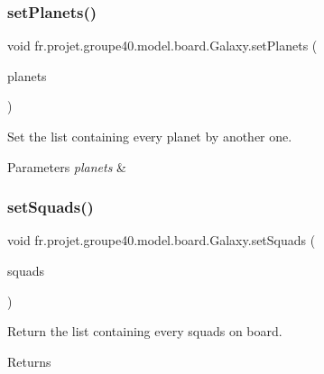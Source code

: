 \subsubsection{\texorpdfstring{set\+Planets()}{setPlanets()}}
{\footnotesize\ttfamily void fr.\+projet.\+groupe40.\+model.\+board.\+Galaxy.\+set\+Planets (\begin{DoxyParamCaption}\item[{Array\+List$<$ \hyperlink{classfr_1_1projet_1_1groupe40_1_1model_1_1board_1_1_planet}{Planet} $>$}]{planets }\end{DoxyParamCaption})}



Set the list containing every planet by another one. 


\begin{DoxyParams}{Parameters}
{\em planets} & \\
\hline
\end{DoxyParams}
\mbox{\label{classfr_1_1projet_1_1groupe40_1_1model_1_1board_1_1_galaxy_afdfdd3a32fa34be534eb436d4fd70788}} 
\subsubsection{\texorpdfstring{set\+Squads()}{setSquads()}}
{\footnotesize\ttfamily void fr.\+projet.\+groupe40.\+model.\+board.\+Galaxy.\+set\+Squads (\begin{DoxyParamCaption}\item[{Array\+List$<$ \hyperlink{classfr_1_1projet_1_1groupe40_1_1model_1_1ships_1_1_squad}{Squad} $>$}]{squads }\end{DoxyParamCaption})}



Return the list containing every squads on board. 

\begin{DoxyReturn}{Returns}

\end{DoxyReturn}
\mbox{\label{classfr_1_1projet_1_1groupe40_1_1model_1_1board_1_1_galaxy_a9758b40b129bd15cea53011c4c632034}} 
